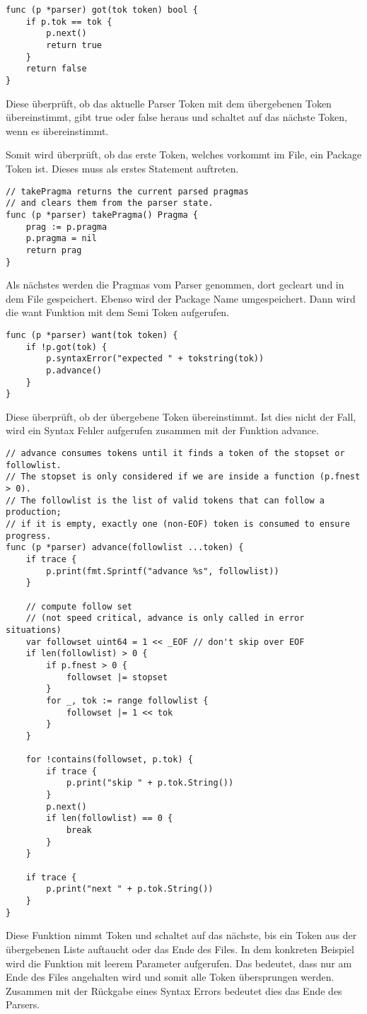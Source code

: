 \begin{lstlisting}
func (p *parser) got(tok token) bool {
	if p.tok == tok {
		p.next()
		return true
	}
	return false
}
\end{lstlisting}
Diese überprüft, ob das aktuelle Parser Token mit dem übergebenen Token übereinstimmt, gibt true oder false heraus und schaltet auf das nächste Token, wenn es übereinstimmt.

Somit wird überprüft, ob das erste Token, welches vorkommt im File, ein Package Token ist. Dieses muss als erstes Statement auftreten.

\begin{lstlisting}
// takePragma returns the current parsed pragmas
// and clears them from the parser state.
func (p *parser) takePragma() Pragma {
	prag := p.pragma
	p.pragma = nil
	return prag
}
\end{lstlisting}
Als nächstes werden die Pragmas vom Parser genommen, dort gecleart und in dem File gespeichert. Ebenso wird der Package Name umgespeichert. Dann wird die want Funktion mit dem Semi Token aufgerufen.

\begin{lstlisting}
func (p *parser) want(tok token) {
	if !p.got(tok) {
		p.syntaxError("expected " + tokstring(tok))
		p.advance()
	}
}
\end{lstlisting}
Diese überprüft, ob der übergebene Token übereinstimmt. Ist dies nicht der Fall, wird ein Syntax Fehler aufgerufen zusammen mit der Funktion advance. 

\begin{lstlisting}
// advance consumes tokens until it finds a token of the stopset or followlist.
// The stopset is only considered if we are inside a function (p.fnest > 0).
// The followlist is the list of valid tokens that can follow a production;
// if it is empty, exactly one (non-EOF) token is consumed to ensure progress.
func (p *parser) advance(followlist ...token) {
	if trace {
		p.print(fmt.Sprintf("advance %s", followlist))
	}

	// compute follow set
	// (not speed critical, advance is only called in error situations)
	var followset uint64 = 1 << _EOF // don't skip over EOF
	if len(followlist) > 0 {
		if p.fnest > 0 {
			followset |= stopset
		}
		for _, tok := range followlist {
			followset |= 1 << tok
		}
	}

	for !contains(followset, p.tok) {
		if trace {
			p.print("skip " + p.tok.String())
		}
		p.next()
		if len(followlist) == 0 {
			break
		}
	}

	if trace {
		p.print("next " + p.tok.String())
	}
}
\end{lstlisting}
Diese Funktion nimmt Token und schaltet auf das nächste, bis ein Token aus der übergebenen Liste auftaucht oder das Ende des Files. In dem konkreten Beispiel wird die Funktion mit leerem Parameter aufgerufen. Das bedeutet, dass nur am Ende des Files angehalten wird und somit alle Token übersprungen werden. Zusammen mit der Rückgabe eines Syntax Errors bedeutet dies das Ende des Parsers.

